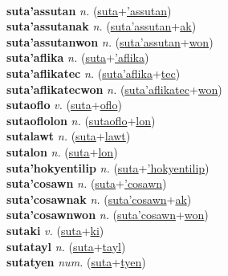  \label{suta'amelika} \\
\textbf{suta'assutan} \textit{n.} (\hyperref[suta]{suta}+\hyperref['assutan]{'assutan})
 \label{suta'assutan} \\
\textbf{suta'assutanak} \textit{n.} (\hyperref[suta'assutan]{suta'assutan}+\hyperref[ak]{ak})
 \label{suta'assutanak} \\
\textbf{suta'assutanwon} \textit{n.} (\hyperref[suta'assutan]{suta'assutan}+\hyperref[won]{won})
 \label{suta'assutanwon} \\
\textbf{suta'aflika} \textit{n.} (\hyperref[suta]{suta}+\hyperref['aflika]{'aflika})
 \label{suta'aflika} \\
\textbf{suta'aflikatec} \textit{n.} (\hyperref[suta'aflika]{suta'aflika}+\hyperref[tec]{tec})
 \label{suta'aflikatec} \\
\textbf{suta'aflikatecwon} \textit{n.} (\hyperref[suta'aflikatec]{suta'aflikatec}+\hyperref[won]{won})
 \label{suta'aflikatecwon} \\
\textbf{sutaoflo} \textit{v.} (\hyperref[suta]{suta}+\hyperref[oflo]{oflo})
 \label{sutaoflo} \\
\textbf{sutaoflolon} \textit{n.} (\hyperref[sutaoflo]{sutaoflo}+\hyperref[lon]{lon})
 \label{sutaoflolon} \\
\textbf{sutalawt} \textit{n.} (\hyperref[suta]{suta}+\hyperref[lawt]{lawt})
 \label{sutalawt} \\
\textbf{sutalon} \textit{n.} (\hyperref[suta]{suta}+\hyperref[lon]{lon})
 \label{sutalon} \\
\textbf{suta'hokyentilip} \textit{n.} (\hyperref[suta]{suta}+\hyperref['hokyentilip]{'hokyentilip})
 \label{suta'hokyentilip} \\
\textbf{suta'cosawn} \textit{n.} (\hyperref[suta]{suta}+\hyperref['cosawn]{'cosawn})
 \label{suta'cosawn} \\
\textbf{suta'cosawnak} \textit{n.} (\hyperref[suta'cosawn]{suta'cosawn}+\hyperref[ak]{ak})
 \label{suta'cosawnak} \\
\textbf{suta'cosawnwon} \textit{n.} (\hyperref[suta'cosawn]{suta'cosawn}+\hyperref[won]{won})
 \label{suta'cosawnwon} \\
\textbf{sutaki} \textit{v.} (\hyperref[suta]{suta}+\hyperref[ki]{ki})
 \label{sutaki} \\
\textbf{sutatayl} \textit{n.} (\hyperref[suta]{suta}+\hyperref[tayl]{tayl})
 \label{sutatayl} \\
\textbf{sutatyen} \textit{num.} (\hyperref[suta]{suta}+\hyperref[tyen]{tyen})
 \label{sutatyen} \\
